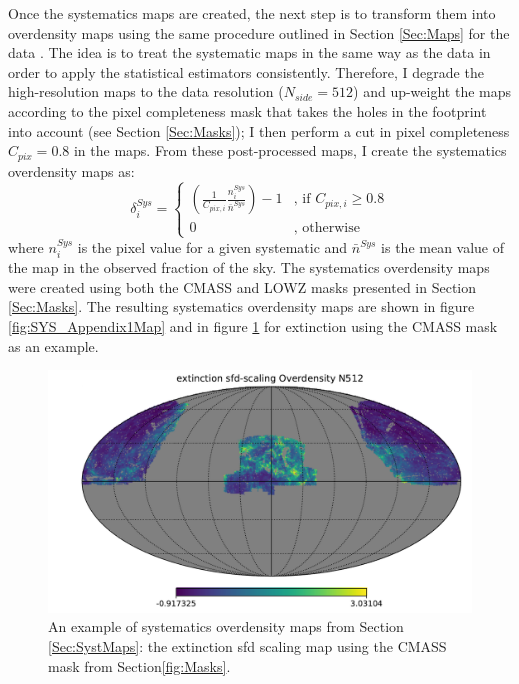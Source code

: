 \qquad Once the \healpix systematics maps are created, the next step is to transform them into overdensity maps using the same procedure outlined in Section \ref{Sec:Maps} for the data \citep{Boris2013}. The idea is to treat the systematic maps in the same way as the data in order to apply the statistical estimators consistently. Therefore, I degrade the high-resolution maps to the data resolution ($N_{side} = 512$) and up-weight the maps according to the pixel completeness mask that takes the holes in the footprint into account (see Section \ref{Sec:Masks}); I then perform a cut in pixel completeness $C_{pix} = 0.8$ in the maps. From these post-processed maps, I create the systematics overdensity maps as: 
\begin{equation}
\delta_{i}^{Sys} = 
\begin{cases}
\left(\frac{1}{C_{pix,i}}\frac{n^{Sys}_{i}}{\bar{n}^{Sys}}\right) - 1 & \text{, if } C_{pix,i} \geq 0.8 \\
0 & \text{, otherwise}
\end{cases}
\label{Eq:OverDMapsSyst}
\end{equation}
where $n^{Sys}_{i}$ is the pixel value for a given systematic and $\bar{n}^{Sys}$ is the mean value of the map in the observed fraction of the sky. The systematics overdensity maps were created using both the CMASS and LOWZ masks presented in Section \ref{Sec:Masks}. The resulting systematics overdensity maps are shown in figure \ref{fig:SYS_Appendix1Map} and in figure \ref{fig:ExtincSys} for extinction using the CMASS mask as an example.

\begin{figure}
\begin{center}
\includegraphics[width=\textwidth]{BOSS-FIGS/map_extinction_sfd-scaling_Overdensity_N512_cmassAll.pdf}
\caption[Extinction SDF scaling overdensity systematic map.]{An example of systematics overdensity maps from Section \ref{Sec:SystMaps}: the extinction sfd scaling map \citep{Schlegel1998} using the CMASS mask from Section\ref{fig:Masks}. }
\label{fig:ExtincSys}
\end{center}
\end{figure}

